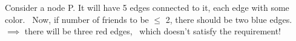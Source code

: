 \documentclass[preview]{standalone}
\begin{document}
\begin{center}
Consider a node P. It will have 5 edges connected to it, each edge with some color. \ Now, if number of friends to be $\le$ 2, there should be two blue edges. \ $\implies$ there will be three red edges, \ which doesn't satisfy the requirement!
\end{center}
\end{document}
